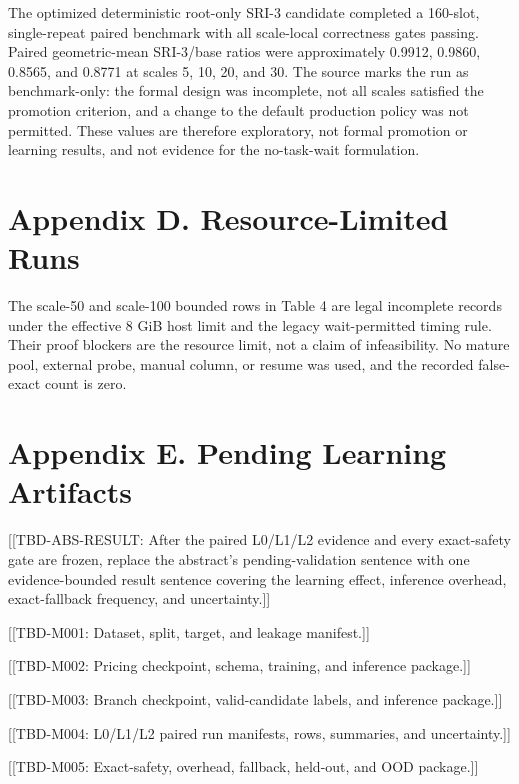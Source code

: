 \documentclass[
  11pt,
]{article}
\begin{document}
The optimized deterministic root-only SRI-3 candidate completed a
160-slot, single-repeat paired benchmark with all scale-local
correctness gates passing. Paired geometric-mean SRI-3/base ratios were
approximately 0.9912, 0.9860, 0.8565, and 0.8771 at scales 5, 10, 20,
and 30. The source marks the run as benchmark-only: the formal design
was incomplete, not all scales satisfied the promotion criterion, and a
change to the default production policy was not permitted. These values
are therefore exploratory, not formal promotion or learning results, and
not evidence for the no-task-wait formulation.

\hypertarget{appendix-d.-resource-limited-runs}{%
\section{Appendix D. Resource-Limited
Runs}\label{appendix-d.-resource-limited-runs}}

The scale-50 and scale-100 bounded rows in Table 4 are legal incomplete
records under the effective 8 GiB host limit and the legacy
wait-permitted timing rule. Their proof blockers are the resource limit,
not a claim of infeasibility. No mature pool, external probe, manual
column, or resume was used, and the recorded false-exact count is zero.

\hypertarget{appendix-e.-pending-learning-artifacts}{%
\section{Appendix E. Pending Learning
Artifacts}\label{appendix-e.-pending-learning-artifacts}}

{[}{[}TBD-ABS-RESULT: After the paired L0/L1/L2 evidence and every
exact-safety gate are frozen, replace the abstract's pending-validation
sentence with one evidence-bounded result sentence covering the learning
effect, inference overhead, exact-fallback frequency, and
uncertainty.{]}{]}

{[}{[}TBD-M001: Dataset, split, target, and leakage manifest.{]}{]}

{[}{[}TBD-M002: Pricing checkpoint, schema, training, and inference
package.{]}{]}

{[}{[}TBD-M003: Branch checkpoint, valid-candidate labels, and inference
package.{]}{]}

{[}{[}TBD-M004: L0/L1/L2 paired run manifests, rows, summaries, and
uncertainty.{]}{]}

{[}{[}TBD-M005: Exact-safety, overhead, fallback, held-out, and OOD
package.{]}{]}
\end{document}
